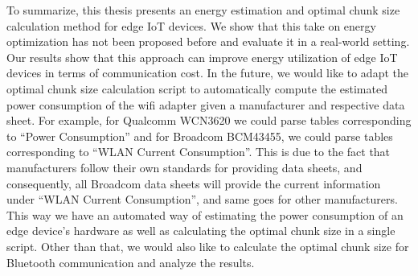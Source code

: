 To summarize, this thesis presents an energy estimation and optimal chunk size calculation method for 
edge IoT devices. We show that this take on energy optimization has not been proposed before and evaluate it in 
a real-world setting. Our results show that this approach can improve energy utilization of edge IoT devices in 
terms of communication cost. In the future, we would like to adapt the optimal chunk size calculation script 
to automatically compute the estimated power consumption of the wifi adapter given a manufacturer and 
respective data sheet. For example, for Qualcomm WCN3620 we could parse tables corresponding to \textquotedblleft Power Consumption\textquotedblright 
 and for Broadcom BCM43455, we could parse tables corresponding to \textquotedblleft WLAN Current Consumption\textquotedblright. 
 This is due to the fact that manufacturers follow their own standards for providing data sheets, and 
 consequently, all Broadcom data sheets will provide the current information under \textquotedblleft WLAN Current Consumption\textquotedblright, 
 and same goes for other manufacturers. This way we 
have an automated way of estimating the power consumption of an edge device's hardware as well as calculating 
the optimal chunk size in a single script. Other than that, we would also like 
to calculate the optimal chunk size for Bluetooth communication and analyze the results. 